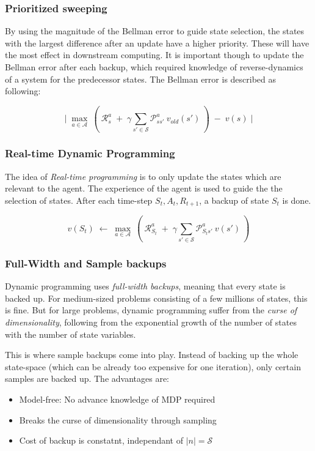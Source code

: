 \documentclass[10pt]{article}
\begin{document}
\subsubsection*{Prioritized sweeping}
By using the magnitude of the Bellman error to guide state selection, the states with the largest difference after an update have a higher priority. These will have the most effect in downstream computing. It is important though to update the Bellman error after each backup, which required knowledge of reverse-dynamics of a system for the predecessor states. The Bellman error is described as following:

\begin{equation}
\Big| \;  \mathop{max}_{a \in \mathcal{A}}\: \left( \: \mathcal{R}_{s}^{a}\;+\;\gamma \sum_{s' \in \mathcal{S}} \mathcal{P}_{ss'}^{a}\:v_{old}(s') \: \right) \; - \; v(s) \; \Big|
\end{equation}

\subsubsection*{Real-time Dynamic Programming}
The idea of \textit{Real-time programming} is to only update the states which are relevant to the agent. The experience of the agent is used to guide the the selection of states. After each time-step $S_{t}, A_{t}, R_{t+1}$, a backup of state $S_{t}$ is done.

\begin{equation}
v(S_{t})\; \leftarrow \; \mathop{max}_{a \in \mathcal{A}}\: \left( \: \mathcal{R}_{S_{t}}^{a}\;+\;\gamma \sum_{s' \in \mathcal{S}} \mathcal{P}_{S_{t}s'}^{a}\:v(s') \: \right) 
\end{equation}

\subsubsection*{Full-Width and Sample backups}
Dynamic programming uses \textit{full-width backups}, meaning that every state is backed up. For medium-sized problems consisting of a few millions of states, this is fine. But for large problems, dynamic programming suffer from the \textit{curse of dimensionality}, following from the exponential growth of the number of states with the number of state variables. 

This is where sample backups come into play. Instead of backing up the whole state-space (which can be already too expensive for one iteration), only certain samples are backed up. The advantages are:
\begin{itemize}
\item Model-free: No advance knowledge of MDP required
\item Breaks the curse of dimensionality through sampling
\item Cost of backup is constatnt, independant of $|n|=\mathcal{S}$ 
\end{itemize}
\newpage
\end{document}
